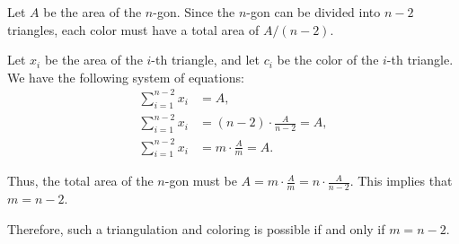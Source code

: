 Let $A$ be the area of the $n$-gon. Since the $n$-gon can be divided into $n-2$ triangles, each color must have a total area of $A/(n-2)$. 

Let $x_i$ be the area of the $i$-th triangle, and let $c_i$ be the color of the $i$-th triangle. We have the following system of equations:
\begin{align*}
\sum_{i=1}^{n-2} x_i &= A, \\
\sum_{i=1}^{n-2} x_i &= (n-2)\cdot \frac{A}{n-2} = A, \\
\sum_{i=1}^{n-2} x_i &= m\cdot \frac{A}{m} = A.
\end{align*}

Thus, the total area of the $n$-gon must be $A = m\cdot \frac{A}{m} = n\cdot \frac{A}{n-2}$. This implies that $m = n-2$.

Therefore, such a triangulation and coloring is possible if and only if $m = n-2$.
